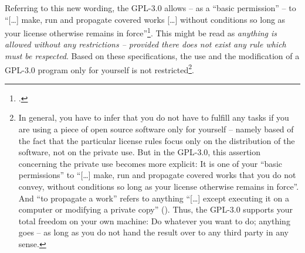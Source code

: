 Referring to this new wording, the GPL-3.0 allows -- as a \enquote{basic
permission} -- to \enquote{[\ldots] make, run and propagate covered works
[\ldots] without conditions so long as your license otherwise remains in
force}\footcite[cf.][\nopage wp. §2]{Gpl30OsiLicense2007a}. This might be read
as \emph{anything is allowed without any restrictions -- provided there does not
exist any rule which must be respected}. Based on these specifications, the use
and the modification of a GPL-3.0 program only for yourself is not
restricted\footnote{In general, you have to infer that you do not have to
fulfill any tasks if you are using a piece of open source software only for
yourself -- namely based of the fact that the particular license rules focus
only on the distribution of the software, not on the private use. But in the
GPL-3.0, this assertion concerning the private use becomes more explicit: It is
one of your \enquote{basic permissions} to \enquote{[\ldots] make, run and
propagate covered works that you do not convey, without conditions so long as
your license otherwise remains in force}. And \enquote{to propagate a work}
refers to anything \enquote{[\ldots] except executing it on a computer or
modifying a private copy} (\cite[cf.][\nopage wp. §2 and
§0]{Gpl30OsiLicense2007a}). Thus, the GPL-3.0 supports your total freedom on
your own machine: Do whatever you want to do; anything goes -- as long as you
do not hand the result over to any third party in any sense.}. 

